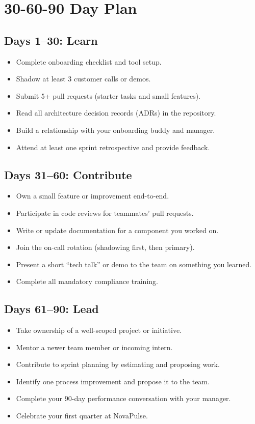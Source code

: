 \documentclass[
    language=english,
    doctype=onboarding-guide,
    institution=none,
]{../../omnilatex}
\begin{document}
\section{30-60-90 Day Plan}

\subsection{Days 1--30: Learn}

\begin{itemize}
    \item Complete onboarding checklist and tool setup.
    \item Shadow at least 3 customer calls or demos.
    \item Submit 5+ pull requests (starter tasks and small features).
    \item Read all architecture decision records (ADRs) in the repository.
    \item Build a relationship with your onboarding buddy and manager.
    \item Attend at least one sprint retrospective and provide feedback.
\end{itemize}

\subsection{Days 31--60: Contribute}

\begin{itemize}
    \item Own a small feature or improvement end-to-end.
    \item Participate in code reviews for teammates' pull requests.
    \item Write or update documentation for a component you worked on.
    \item Join the on-call rotation (shadowing first, then primary).
    \item Present a short ``tech talk'' or demo to the team on something
          you learned.
    \item Complete all mandatory compliance training.
\end{itemize}

\subsection{Days 61--90: Lead}

\begin{itemize}
    \item Take ownership of a well-scoped project or initiative.
    \item Mentor a newer team member or incoming intern.
    \item Contribute to sprint planning by estimating and proposing work.
    \item Identify one process improvement and propose it to the team.
    \item Complete your 90-day performance conversation with your manager.
    \item Celebrate your first quarter at NovaPulse.
\end{itemize}
\end{document}
